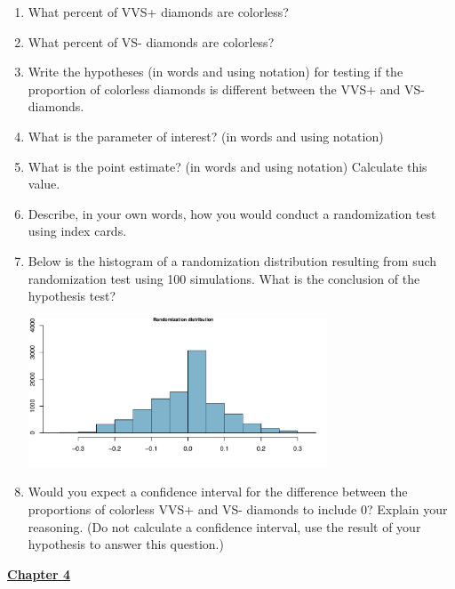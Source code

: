 \documentclass[11pt]{article}
\begin{document}
\begin{itemize}
\begin{enumerate}
\begin{enumerate}
\item What percent of VVS+ diamonds are colorless?
\item What percent of VS- diamonds are colorless?
\item Write the hypotheses (in words and using notation) for testing if the proportion of colorless diamonds is different between the VVS+ and VS- diamonds.
\item What is the parameter of interest? (in words and using notation)
\item What is the point estimate? (in words and using notation) Calculate this value.
\item Describe, in your own words, how you would conduct a randomization test using index cards.
\item Below is the histogram of a randomization distribution resulting from such randomization test using 100 simulations. What is the conclusion of the hypothesis test?
\begin{center}
\includegraphics[width=0.7\textwidth]{figures/diamond/diamonds_color_rand} 
\end{center}
\item Would you expect a confidence interval for the difference between the proportions of colorless VVS+ and VS- diamonds to include 0? Explain your reasoning. (Do not calculate a confidence interval, use the result of your hypothesis to answer this question.) 

\end{enumerate}

\end{enumerate}

\end{itemize}

%

\pagebreak

{\large \textbf{\underline{Chapter 4}}}
\end{document}
